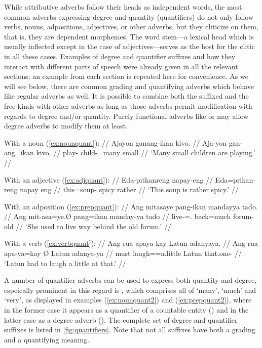While attributive adverbs follow their heads as independent words, the most 
common adverbs expressing degree and quantity (quantifiers) do not only follow 
verbs, nouns, adpositions, adjectives, or other adverbs, but they cliticize on 
them, that is, they are dependent morphemes. The word stem---a lexical head 
which is usually inflected except in the case of adjectives---serves as the 
host for the clitic in all these cases. Examples of degree and quantifier 
suffixes and how they interact with different parts of speech were already 
given in all the relevant sections; an example from each section is repeated 
here for convenience. As we will see below, there are common grading and 
quantifying adverbs which behave like regular adverbs as well. It is possible 
to combine both the suffixed and the free kinds with other adverbs as long as 
those adverbs permit modification with regards to degree and/or quantity. 
Purely functional adverbs like  or 
 may allow degree adverbs to modify them at 
least.

\pex
\a\label{ex:nounquant2}\begingl
	\glpreamble With a noun (\ref{ex:nounquant}): //
	\gla Ajayon ganang-ikan kivo. //
	\glb Aja-yon gan-ang=ikan kivo. //
	\glc play-\TsgN{} child-\Aarg{}=many small //
	\glft `Many small children are playing.' //
\endgl

\a\label{ex:adjquant2}\begingl
	\glpreamble With an adjective (\ref{ex:adjquant}): //
	\gla Eda-prikanreng napay-eng //
	\glb Eda=prikan-reng {napay eng} //
	\glc this=soup-\AargI{} {spicy rather} //
	\glft `This soup is rather spicy.' //
\endgl

\a\label{ex:prepquant2}\begingl
	\glpreamble With an adposition (\ref{ex:prepquant}): //
	\gla Ang mitasaye pang-ikan mandayya tado. //
	\glb Ang mit-asa=ye.Ø pang=ikan manday-ya tado //
	\glc \AgtT{} live-\Hab{}=\TsgF{}.\Top{} back=much forum-\Loc{} old //
	\glft `She used to live way behind the old forum.' //
\endgl

\a\label{ex:verbquant2}\begingl
	\glpreamble With a verb (\ref{ex:verbquant}): //
	\gla Ang rua apaya-kay {} Latun adanyaya. //
	\glb Ang rua apa-ya=kay Ø Latun adanya-ya //
	\glc \AgtT{} must laugh=\TsgM{}=a.little \Top{} Latun that.one-\Loc{} //
	\glft `Latun had to laugh a little at that.' //
\endgl

\xe

A number of quantifier adverbs can be used to express both quantity and 
degree, espeically prominent in this regard is , which 
comprises all of `many', `much' and `very', as displayed in examples 
(\ref{ex:nounquant2}) and (\ref{ex:prepquant2}), where in the former case it 
appears as a quantifier of a countable entity 
() and in the latter case as a 
degree adverb (). The complete set of 
degree and quantifier suffixes is listed in \autoref{fig:quantifiers}. Note 
that not all suffixes have both a grading and a quantifying meaning.

